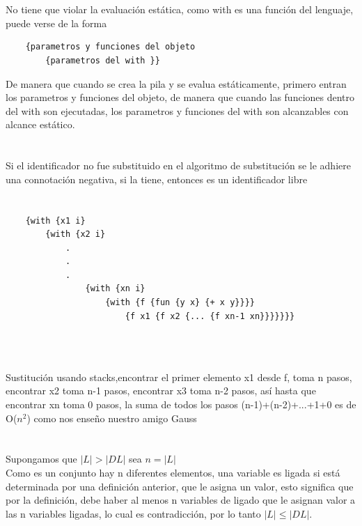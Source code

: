 \documentclass{article}
\begin{document}
\section{}
No tiene que violar la evaluación estática, como with es una función del lenguaje, puede verse de la forma 
\begin{verbatim}
    {parametros y funciones del objeto
        {parametros del with }}
\end{verbatim}
De manera que cuando se crea la pila y se evalua estáticamente, primero entran los parametros y funciones del objeto, de manera que
cuando las funciones dentro del with son ejecutadas, los parametros y funciones del with son alcanzables con alcance estático.
\section{}
Si el identificador no fue substituido en el algoritmo de substitución se le adhiere una connotación negativa, si la tiene, entonces es un identificador libre
\section{}
\subsection{}
\begin{verbatim}
    {with {x1 i}
        {with {x2 i}
            .
            .
            .
                {with {xn i}
                    {with {f {fun {y x} {+ x y}}}}
                        {f x1 {f x2 {... {f xn-1 xn}}}}}}}

 
\end{verbatim}
\subsection{}
Sustitución usando stacks,encontrar el primer elemento x1 desde f, toma n pasos, encontrar x2 toma n-1 pasos, encontrar x3 toma n-2 pasos, así hasta que encontrar xn toma 0 pasos, la suma de todos los pasos (n-1)+(n-2)+...+1+0 es de O($n^2$) como nos enseño nuestro amigo Gauss
\section{}
Supongamos que $|L|>|DL| $  sea   $ n = |L|$  \\  Como es un conjunto hay n diferentes elementos, una variable es ligada si está determinada
por una definición anterior, que le asigna un valor, esto significa que por la definición, debe haber al menos n variables de ligado que le asignan valor
a las n variables ligadas, lo cual es contradicción, por lo tanto $|L|\leq|DL|$.
\end{document}
